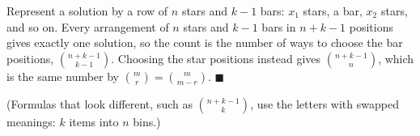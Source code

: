 Represent a solution by a row of $n$ stars and $k-1$ bars: $x_1$ stars, a bar, $x_2$ stars, and so on. Every arrangement of $n$ stars and $k-1$ bars in $n+k-1$ positions gives exactly one solution, so the count is the number of ways to choose the bar positions, $\binom{n+k-1}{k-1}$. Choosing the star positions instead gives $\binom{n+k-1}{n}$, which is the same number by $\binom mr=\binom m{m-r}$. $\blacksquare$

(Formulas that look different, such as $\binom{n+k-1}{k}$, use the letters with swapped meanings: $k$ items into $n$ bins.)
